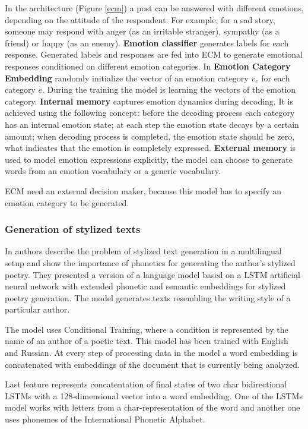 In the architecture (Figure \ref{ecm}) a post can be answered with different emotions, depending on the attitude of the respondent. For example, for a sad story, someone may respond with anger  (as an irritable stranger), sympathy (as a friend) or happy (as an enemy). \textbf{Emotion classifier} generates labels for each response. Generated labels and responses are fed into ECM to generate emotional responses conditioned on different emotion categories. In \textbf{Emotion Category Embedding} randomly initialize the vector of an emotion category $v_e$ for each category $e$. During the training the model is learning the vectors of the emotion category. \textbf{Internal memory} captures emotion dynamics during decoding. It is achieved using the following concept: before the decoding process each category has an internal emotion state; at each step the emotion state decays by a certain amount; when decoding process is completed, the emotion state should be zero, what indicates that the emotion is completely expressed. \textbf{External memory} is used to model emotion expressions explicitly, the model can choose to generate words from  an emotion vocabulary or a generic vocabulary.

ECM need an external decision maker, because this model has to specify an emotion category to be generated.

\subsubsection{Generation of stylized texts}

In \cite{tikhonov2018guess} authors describe the problem of stylized text generation in a multilingual setup and show the importance of phonetics for generating the author's stylized poetry. They presented a version of a language model based on a LSTM artificial neural network with extended phonetic and semantic embeddings for stylized poetry generation. The model generates texts resembling the writing style of a particular author.

The model uses Conditional Training, where a condition is represented by the name of an author of a poetic text. This model has been trained with English and Russian. At every step of processing data in the model a word embedding is concatenated with embeddings of the document that is currently being analyzed.

Last feature represents concatentation of final states of two char bidirectional LSTMs with a 128-dimensional vector into a word embedding. One of the LSTMs model works with letters from a char-representation of the word and another one uses phonemes of the International Phonetic Alphabet.  

